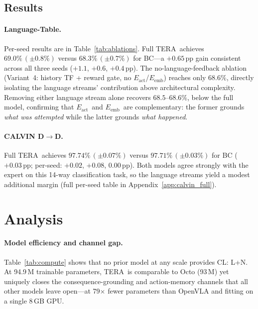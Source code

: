 \documentclass{article}
\newcommand{\modelname}{\textsc{TERA}\xspace}
\newcommand{\Lact}{$E_{\mathrm{act}}$\xspace}
\newcommand{\Lexp}{$E_{\mathrm{emb}}$\xspace}
\begin{document}
\subsection{Results}
\label{sec:results}

\paragraph{Language-Table.}
Per-seed results are in Table~\ref{tab:ablations}.
Full \modelname\ achieves $69.0\%\,(\pm0.8\%)$ versus $68.3\%\,(\pm0.7\%)$ for
BC---a $+0.65$\,pp gain consistent across all three seeds
($+1.1$, $+0.6$, $+0.4$\,pp).
The no-language-feedback ablation (Variant~4: history TF + reward gate, no
\Lact/\Lexp) reaches only $68.6\%$, directly isolating the language streams'
contribution above architectural complexity.
Removing either language stream alone recovers $68.5$--$68.6\%$, below the
full model, confirming that \Lact\ and \Lexp\ are complementary: the former
grounds \emph{what was attempted} while the latter grounds \emph{what happened}.

\paragraph{CALVIN D$\to$D.}
Full \modelname\ achieves $97.74\%\,(\pm0.07\%)$ versus $97.71\%\,(\pm0.03\%)$
for BC ($+0.03$\,pp; per-seed: $+0.02$, $+0.08$, $0.00$\,pp).
Both models agree strongly with the expert on this 14-way classification task,
so the language streams yield a modest additional margin
(full per-seed table in Appendix~\ref{app:calvin_full}).

\section{Analysis}
\label{sec:analysis}

\paragraph{Model efficiency and channel gap.}
Table~\ref{tab:compute} shows that no prior model at any scale provides CL: L+N.
At 94.9\,M trainable parameters, \modelname\ is comparable to Octo (93\,M) yet
uniquely closes the consequence-grounding and action-memory channels that all
other models leave open---at 79$\times$ fewer parameters than OpenVLA and
fitting on a single 8\,GB GPU.
\end{document}
